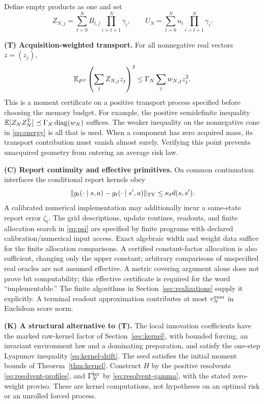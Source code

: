 Define empty products as one and set
\begin{equation}\label{eq:transport}
 Z_{N,j}=\sum_{t=0}^N B_{t,j}\prod_{i=t+1}^N \gamma_i,
 \qquad U_N=\sum_{t=0}^N u_t\prod_{i=t+1}^N \gamma_i.
\end{equation}

\smallskip\noindent\textbf{(T) Acquisition-weighted transport.}
For all nonnegative real vectors $z=(z_j)$,
\begin{equation}\label{eq:energy}
 \mathbb E_{P^\beta}\left(\sum_j Z_{N,j}z_j\right)^2
 \le \Gamma_N\sum_j w_{N,j}z_j^2.
\end{equation}
This is a moment certificate on a positive transport process specified before choosing the memory budget. For example, the positive semidefinite inequality $\mathbb E[Z_NZ_N^{\mathsf T}]\preceq\Gamma_N\operatorname{diag}(w_N)$ suffices. The weaker inequality on the nonnegative cone in \eqref{eq:energy} is all that is used. When a component has zero acquired mass, its transport contribution must vanish almost surely. Verifying this point prevents unacquired geometry from entering an average risk law.

\smallskip\noindent\textbf{(C) Report continuity and effective primitives.}
On common continuation interfaces the conditional report kernels obey
\begin{equation}\label{eq:report}
 \lVert g_t(\cdot\mid s,a)-g_t(\cdot\mid s',a)\rVert_{\mathrm{TV}}\le\kappa_t d(s,s').
\end{equation}
A calibrated numerical implementation may additionally incur a same-state report error $\zeta_t$. The grid descriptions, update routines, readouts, and finite allocation search in \eqref{eq:psi} are specified by finite programs with declared calibration/numerical input access. Exact algebraic width and weight data suffice for the finite allocation comparisons. A certified constant-factor allocation is also sufficient, changing only the upper constant; arbitrary comparisons of unspecified real oracles are not assumed effective. A metric covering argument alone does not prove bit computability; this effective certificate is required for the word ``implementable.'' The finite algorithms in Section~\ref{sec:realizations} supply it explicitly. A terminal readout approximation contributes at most $v_N^{\rm num}$ in Euclidean score norm.

\smallskip\noindent\textbf{(K) A structural alternative to (T).}
The local innovation coefficients have the marked raw-kernel factor of Section~\ref{sec:kernel}, with bounded forcing, an invariant environment law and a dominating preparation, and satisfy the one-step Lyapunov inequality \eqref{eq:kernel-drift}. The seed satisfies the initial moment bounds of Theorem~\ref{thm:kernel}. Construct $H$ by the positive resolvents \eqref{eq:resolvent-profiles}, and $\Gamma_N^{\rm ker}$ by \eqref{eq:resolvent-gamma}, with the stated zero-weight proviso. These are kernel computations, not hypotheses on an optimal risk or an unrolled forced process.

